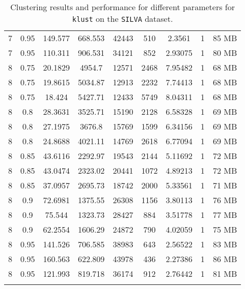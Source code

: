 \begin{longtable}{c|c|c|c|c|c|c|c|c}
  7   &  0.95  &  149.577  &  668.553  &  42443  &  510   &  2.3561   &  1  &  85  MB \\
  7   &  0.95  &  110.311  &  906.531  &  34121  &  852   &  2.93075  &  1  &  80  MB \\
  \hline
  8   &  0.75  &  20.1829  &  4954.7   &  12571  &  2468  &  7.95482  &  1  &  68  MB \\
  8   &  0.75  &  19.8615  &  5034.87  &  12913  &  2232  &  7.74413  &  1  &  68  MB \\
  8   &  0.75  &  18.424   &  5427.71  &  12433  &  5749  &  8.04311  &  1  &  68  MB \\
  \hline
  8   &  0.8   &  28.3631  &  3525.71  &  15190  &  2128  &  6.58328  &  1  &  69  MB \\
  8   &  0.8   &  27.1975  &  3676.8   &  15769  &  1599  &  6.34156  &  1  &  69  MB \\
  8   &  0.8   &  24.8688  &  4021.11  &  14769  &  2618  &  6.77094  &  1  &  69  MB \\
  \hline
  8   &  0.85  &  43.6116  &  2292.97  &  19543  &  2144  &  5.11692  &  1  &  72  MB \\
  8   &  0.85  &  43.0474  &  2323.02  &  20441  &  1072  &  4.89213  &  1  &  72  MB \\
  8   &  0.85  &  37.0957  &  2695.73  &  18742  &  2000  &  5.33561  &  1  &  71  MB \\
  \hline
  8   &  0.9   &  72.6981  &  1375.55  &  26308  &  1156  &  3.80113  &  1  &  76  MB \\
  8   &  0.9   &  75.544   &  1323.73  &  28427  &  884   &  3.51778  &  1  &  77  MB \\
  8   &  0.9   &  62.2554  &  1606.29  &  24872  &  790   &  4.02059  &  1  &  75  MB \\
  \hline
  8   &  0.95  &  141.526  &  706.585  &  38983  &  643   &  2.56522  &  1  &  83  MB \\
  8   &  0.95  &  160.563  &  622.809  &  43978  &  436   &  2.27386  &  1  &  86  MB \\
  8   &  0.95  &  121.993  &  819.718  &  36174  &  912   &  2.76442  &  1  &  81  MB \\

  \caption{Clustering results and performance for different parameters for
    \texttt{klust} on the \texttt{SILVA} dataset.}
  \label{fig:klust_results_params}
\end{longtable}
\endgroup

